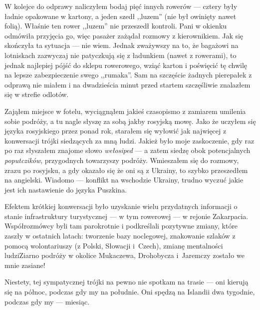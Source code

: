 
W kolejce do odprawy naliczyłem bodaj pięć innych rowerów --- cztery były ładnie opakowane w kartony, a jeden szedł ,,luzem'' (nie był owinięty nawet folią). Właśnie ten rower ,,luzem'' nie przeszedł kontroli. Pani w okienku odmówiła przyjęcia go, więc pasażer zażądał rozmowy z kierownikiem. Jak się skończyła ta sytuacja --- nie wiem. Jednak zważywszy na to, że bagażowi na lotniskach zazwyczaj nie patyczkują się z ładunkiem (nawet z rowerami), to jednak najlepiej pójść do sklepu rowerowego, wziąć karton i poświęcić tę chwilę na lepsze zabezpieczenie swego ,,rumaka''. Sam na szczęście żadnych pierepałek z odprawą nie miałem i na dwadzieścia minut przed startem szczęśliwie znalazłem się w strefie odlotów.

Zająłem miejsce w fotelu, wyciągnąłem jakieś czasopismo z zamiarem umilenia sobie podróży, a tu nagle słyszę za sobą jakby rosyjską mowę. Jako że uczyłem się języka rosyjskiego przez ponad rok, starałem się wyłowić jak najwięcej z konwersacji trójki siedzących za mną ludzi. Jakież było moje zaskoczenie, gdy raz po raz słyszałem znajome słowo \emph{wełosiped} --- a zatem siedzę obok potencjalnych \emph{poputczików}, przygodnych towarzyszy podróży. Wmieszałem się do rozmowy, zrazu po rosyjsku, a gdy okazało się że oni są z Ukrainy, to szybko przeszedłem na angielski. Wiadomo --- konflikt na wschodzie Ukrainy, trudno wyczuć jakie jest ich nastawienie do języka Puszkina.

Efektem krótkiej konwersacji było uzyskanie wielu przydatnych informacji o stanie infrastruktury turystycznej --- w tym rowerowej --- w rejonie Zakarpacia. Współrozmówcy byli tam parokrotnie i podkreślali pozytywne zmiany, które zaszły w ostatnich latach: tworzenie bazy noclegowej, znakowanie szlaków z pomocą wolontariuszy (z Polski, Słowacji i~Czech), zmianę mentalności ludzi\textellipsis  Ziarno podróży w okolice Mukaczewa, Drohobycza i~Jaremczy zostało we mnie zasiane!

Niestety, tej sympatycznej trójki na pewno nie spotkam na trasie --- oni kierują się na północ, podczas gdy my na południe. Oni spędzą na Islandii dwa tygodnie, podczas gdy my --- miesiąc.

